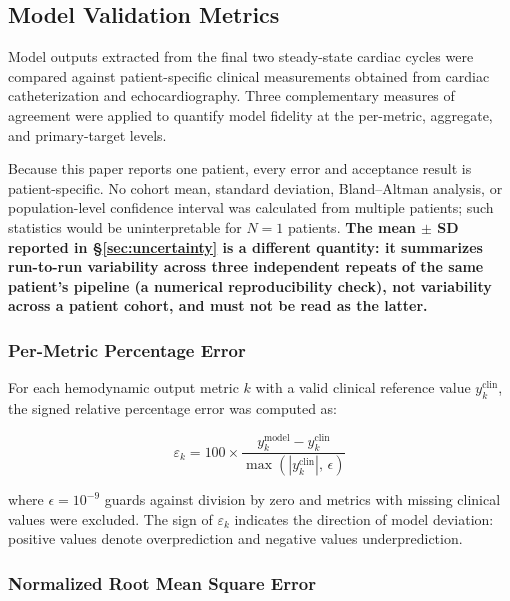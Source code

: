 \documentclass{article}
\begin{document}
\subsection{Model Validation Metrics}
\label{sec:validation}

Model outputs extracted from the final two steady-state cardiac
cycles were compared against patient-specific clinical measurements
obtained from cardiac catheterization and echocardiography.
Three complementary measures of agreement were applied to
quantify model fidelity at the per-metric, aggregate, and
primary-target levels.

Because this paper reports one patient, every error and acceptance result
is patient-specific. No cohort mean, standard deviation, Bland--Altman
analysis, or population-level confidence interval was calculated from
multiple patients; such statistics would be uninterpretable for $N=1$
patients. \textbf{The mean $\pm$ SD reported in \S\ref{sec:uncertainty} is
a different quantity: it summarizes run-to-run variability across three
independent repeats of the same patient's pipeline (a numerical
reproducibility check), not variability across a patient cohort, and must
not be read as the latter.}

\subsubsection{Per-Metric Percentage Error}

For each hemodynamic output metric $k$ with a valid clinical
reference value $y_k^\mathrm{clin}$, the signed relative
percentage error was computed as:

\begin{equation}
    \varepsilon_k
    = 100 \times
      \frac{y_k^\mathrm{model} - y_k^\mathrm{clin}}
           {\max\!\left(|y_k^\mathrm{clin}|,\, \epsilon\right)}
    \label{eq:pct_error}
\end{equation}

\noindent where $\epsilon = 10^{-9}$ guards against division by
zero and metrics with missing clinical values were excluded.
The sign of $\varepsilon_k$ indicates the direction of model
deviation: positive values denote overprediction and negative
values underprediction.

\subsubsection{Normalized Root Mean Square Error}
\end{document}
